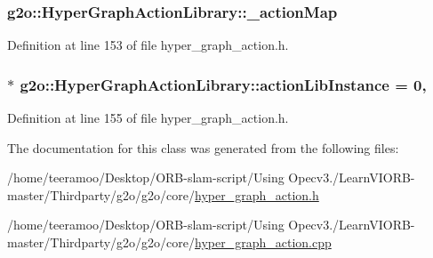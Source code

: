 \subsubsection[{\texorpdfstring{\+\_\+action\+Map}{_actionMap}}]{ g2o\+::\+Hyper\+Graph\+Action\+Library\+::\+\_\+action\+Map\hspace{0.3cm}{\ttfamily [protected]}}\hypertarget{classg2o_1_1HyperGraphActionLibrary_afc9e9b39a743700dcfc896b50d176b3b}{}\label{classg2o_1_1HyperGraphActionLibrary_afc9e9b39a743700dcfc896b50d176b3b}


Definition at line 153 of file hyper\+\_\+graph\+\_\+action.\+h.

\subsubsection[{\texorpdfstring{action\+Lib\+Instance}{actionLibInstance}}]{ $\ast$ g2o\+::\+Hyper\+Graph\+Action\+Library\+::action\+Lib\+Instance = 0\hspace{0.3cm}{\ttfamily [static]}, {\ttfamily [private]}}\hypertarget{classg2o_1_1HyperGraphActionLibrary_a65d1811736d86ff9f6453a728cac160f}{}\label{classg2o_1_1HyperGraphActionLibrary_a65d1811736d86ff9f6453a728cac160f}


Definition at line 155 of file hyper\+\_\+graph\+\_\+action.\+h.



The documentation for this class was generated from the following files\+:\begin{DoxyCompactItemize}
\item 
/home/teeramoo/\+Desktop/\+O\+R\+B-\/slam-\/script/\+Using Opecv3./\+Learn\+V\+I\+O\+R\+B-\/master/\+Thirdparty/g2o/g2o/core/\hyperlink{hyper__graph__action_8h}{hyper\+\_\+graph\+\_\+action.\+h}\item 
/home/teeramoo/\+Desktop/\+O\+R\+B-\/slam-\/script/\+Using Opecv3./\+Learn\+V\+I\+O\+R\+B-\/master/\+Thirdparty/g2o/g2o/core/\hyperlink{hyper__graph__action_8cpp}{hyper\+\_\+graph\+\_\+action.\+cpp}\end{DoxyCompactItemize}
